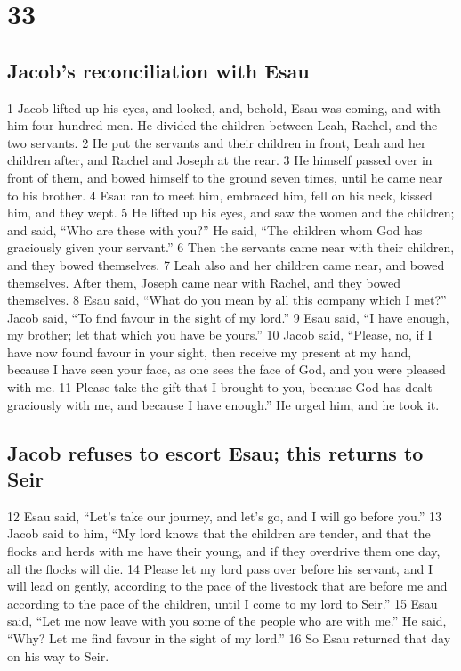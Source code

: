\hypertarget{section-32}{%
\section{33}\label{section-32}}

\hypertarget{jacobs-reconciliation-with-esau}{%
\subsection{Jacob's reconciliation with
Esau}\label{jacobs-reconciliation-with-esau}}

{1} Jacob lifted up his eyes, and looked, and, behold, Esau was coming,
and with him four hundred men. He divided the children between Leah,
Rachel, and the two servants. {2} He put the servants and their children
in front, Leah and her children after, and Rachel and Joseph at the
rear. {3} He himself passed over in front of them, and bowed himself to
the ground seven times, until he came near to his brother. {4} Esau ran
to meet him, embraced him, fell on his neck, kissed him, and they wept.
{5} He lifted up his eyes, and saw the women and the children; and said,
``Who are these with you?'' He said, ``The children whom God has
graciously given your servant.'' {6} Then the servants came near with
their children, and they bowed themselves. {7} Leah also and her
children came near, and bowed themselves. After them, Joseph came near
with Rachel, and they bowed themselves. {8} Esau said, ``What do you
mean by all this company which I met?'' Jacob said, ``To find favour in
the sight of my lord.'' {9} Esau said, ``I have enough, my brother; let
that which you have be yours.'' {10} Jacob said, ``Please, no, if I have
now found favour in your sight, then receive my present at my hand,
because I have seen your face, as one sees the face of God, and you were
pleased with me. {11} Please take the gift that I brought to you,
because God has dealt graciously with me, and because I have enough.''
He urged him, and he took it.

\hypertarget{jacob-refuses-to-escort-esau-this-returns-to-seir}{%
\subsection{Jacob refuses to escort Esau; this returns to
Seir}\label{jacob-refuses-to-escort-esau-this-returns-to-seir}}

{12} Esau said, ``Let's take our journey, and let's go, and I will go
before you.'' {13} Jacob said to him, ``My lord knows that the children
are tender, and that the flocks and herds with me have their young, and
if they overdrive them one day, all the flocks will die. {14} Please let
my lord pass over before his servant, and I will lead on gently,
according to the pace of the livestock that are before me and according
to the pace of the children, until I come to my lord to Seir.'' {15}
Esau said, ``Let me now leave with you some of the people who are with
me.'' He said, ``Why? Let me find favour in the sight of my lord.'' {16}
So Esau returned that day on his way to Seir.

